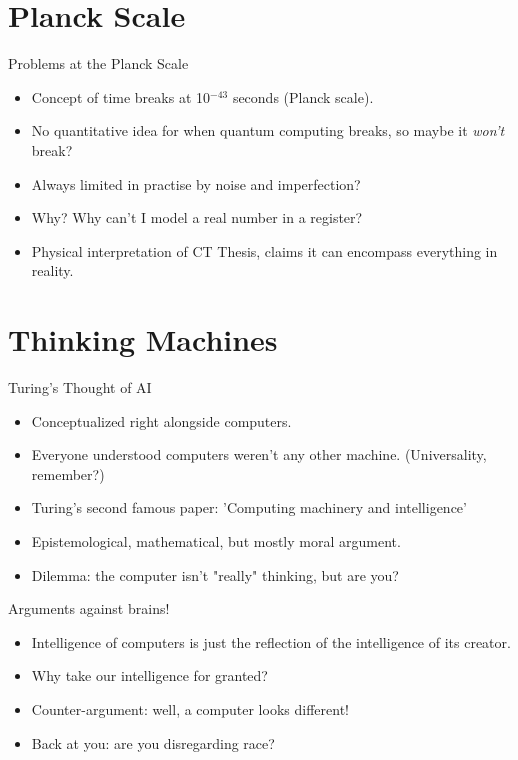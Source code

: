 \documentclass[
    11pt, %
    aspectratio=169, %
]{beamer}
\begin{document}
\section{Planck Scale}
\begin{frame}{Problems at the Planck Scale}
\begin{itemize}
    \item Concept of time breaks at 10$^{-43}$ seconds (Planck scale).
    \item No quantitative idea for when quantum computing breaks, so maybe it \emph{won't} break?
    \item Always limited in practise by noise and imperfection?
    \item Why? Why can't I model a real number in a register?
    \item Physical interpretation of CT Thesis, claims it can encompass everything in reality.
\end{itemize} 
\end{frame}

\section{Thinking Machines}
\begin{frame}{Turing's Thought of AI}
    \begin{itemize}
        \item Conceptualized right alongside computers.
        \item Everyone understood computers weren't any other machine. (Universality, remember?)
        \item Turing's second famous paper: 'Computing machinery and intelligence'
        \item Epistemological, mathematical, but mostly \alert{moral} argument.
        \item Dilemma: the computer isn't "really" thinking, but are you?
    \end{itemize}
\end{frame}

\begin{frame}{Arguments against brains!}
\begin{itemize}
    \item<1-> Intelligence of computers is just the reflection of the intelligence of its creator.
    \item<2-> Why take our intelligence for granted?
    \item<3-> Counter-argument: well, a computer looks different! 
    \item<4-> Back at you: are you disregarding race?
\end{itemize}
\end{frame}
\end{document}
